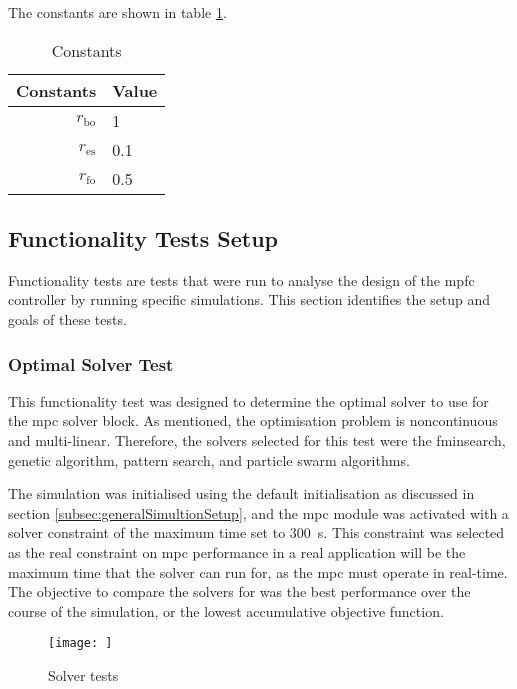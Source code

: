 \documentclass[conference]{IEEEtran}
\begin{document}

The constants are shown in table \ref{tab:settings_general_constants}.

\begin{table}[]
    \centering
    \caption{Constants}
    \label{tab:settings_general_constants}
    \begin{tabular}{r|l}
        \toprule
        Constants & Value \\
        \midrule
        $r_{\text{bo}}$ & 1 \\
        $r_{\text{es}}$ & 0.1 \\
        $r_{\text{fo}}$ & 0.5 \\
        \bottomrule
    \end{tabular}
\end{table}

\subsection{Functionality Tests Setup}
Functionality tests are tests that were run to analyse the design of the \gls{mpfc} controller by running specific simulations.
This section identifies the setup and goals of these tests.

\subsubsection{Optimal Solver Test}
This functionality test was designed to determine the optimal solver to use for the \gls{mpc} solver block.
As mentioned, the optimisation problem is noncontinuous and multi-linear.
Therefore, the solvers selected for this test were the fminsearch, genetic algorithm, pattern search, and particle swarm algorithms.

The simulation was initialised using the default initialisation as discussed in section \ref{subsec:generalSimultionSetup}, and the \gls{mpc} module was activated with a solver constraint of the maximum time set to \SI{300}{\second}.
This constraint was selected as the real constraint on \gls{mpc} performance in a real application will be the maximum time that the solver can run for, as the \gls{mpc} must operate in real-time.
The objective to compare the solvers for was the best performance over the course of the simulation, or the lowest accumulative objective function.

\begin{figure}
    \centering
    \texttt{[image: ]}
    \caption{Solver tests}
    \label{fig:plot_solver_test}
\end{figure}
\end{document}
